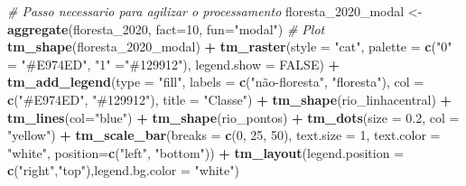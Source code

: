 \documentclass[
]{article}
\newenvironment{Shaded}{\begin{snugshade}}{\end{snugshade}}
\newcommand{\AttributeTok}[1]{\textcolor[rgb]{0.13,0.29,0.53}{#1}}
\newcommand{\CommentTok}[1]{\textcolor[rgb]{0.56,0.35,0.01}{\textit{#1}}}
\newcommand{\ConstantTok}[1]{\textcolor[rgb]{0.56,0.35,0.01}{#1}}
\newcommand{\DecValTok}[1]{\textcolor[rgb]{0.00,0.00,0.81}{#1}}
\newcommand{\FloatTok}[1]{\textcolor[rgb]{0.00,0.00,0.81}{#1}}
\newcommand{\FunctionTok}[1]{\textcolor[rgb]{0.13,0.29,0.53}{\textbf{#1}}}
\newcommand{\NormalTok}[1]{#1}
\newcommand{\OtherTok}[1]{\textcolor[rgb]{0.56,0.35,0.01}{#1}}
\newcommand{\SpecialCharTok}[1]{\textcolor[rgb]{0.81,0.36,0.00}{\textbf{#1}}}
\newcommand{\StringTok}[1]{\textcolor[rgb]{0.31,0.60,0.02}{#1}}
\begin{document}
\begin{Shaded}
\begin{Highlighting}[]
\CommentTok{\# Passo necessario para agilizar o processamento}
\NormalTok{floresta\_2020\_modal }\OtherTok{\textless{}{-}} \FunctionTok{aggregate}\NormalTok{(floresta\_2020, }
                                 \AttributeTok{fact=}\DecValTok{10}\NormalTok{, }
                                 \AttributeTok{fun=}\StringTok{"modal"}\NormalTok{)}
\CommentTok{\# Plot}
\FunctionTok{tm\_shape}\NormalTok{(floresta\_2020\_modal) }\SpecialCharTok{+}
  \FunctionTok{tm\_raster}\NormalTok{(}\AttributeTok{style =} \StringTok{"cat"}\NormalTok{, }
            \AttributeTok{palette =} \FunctionTok{c}\NormalTok{(}\StringTok{"0"} \OtherTok{=} \StringTok{"\#E974ED"}\NormalTok{, }\StringTok{"1"} \OtherTok{=}\StringTok{"\#129912"}\NormalTok{), }\AttributeTok{legend.show =} \ConstantTok{FALSE}\NormalTok{) }\SpecialCharTok{+} 
  \FunctionTok{tm\_add\_legend}\NormalTok{(}\AttributeTok{type =} \StringTok{"fill"}\NormalTok{, }\AttributeTok{labels =} \FunctionTok{c}\NormalTok{(}\StringTok{"não{-}floresta"}\NormalTok{, }\StringTok{"floresta"}\NormalTok{),}
    \AttributeTok{col =} \FunctionTok{c}\NormalTok{(}\StringTok{"\#E974ED"}\NormalTok{, }\StringTok{"\#129912"}\NormalTok{), }\AttributeTok{title =} \StringTok{"Classe"}\NormalTok{) }\SpecialCharTok{+}
\FunctionTok{tm\_shape}\NormalTok{(rio\_linhacentral) }\SpecialCharTok{+} 
  \FunctionTok{tm\_lines}\NormalTok{(}\AttributeTok{col=}\StringTok{"blue"}\NormalTok{) }\SpecialCharTok{+} 
\FunctionTok{tm\_shape}\NormalTok{(rio\_pontos) }\SpecialCharTok{+} 
  \FunctionTok{tm\_dots}\NormalTok{(}\AttributeTok{size =} \FloatTok{0.2}\NormalTok{, }\AttributeTok{col =} \StringTok{"yellow"}\NormalTok{) }\SpecialCharTok{+} 
\FunctionTok{tm\_scale\_bar}\NormalTok{(}\AttributeTok{breaks =} \FunctionTok{c}\NormalTok{(}\DecValTok{0}\NormalTok{, }\DecValTok{25}\NormalTok{, }\DecValTok{50}\NormalTok{), }\AttributeTok{text.size =} \DecValTok{1}\NormalTok{, }
             \AttributeTok{text.color =} \StringTok{"white"}\NormalTok{, }\AttributeTok{position=}\FunctionTok{c}\NormalTok{(}\StringTok{"left"}\NormalTok{, }\StringTok{"bottom"}\NormalTok{)) }\SpecialCharTok{+}
\FunctionTok{tm\_layout}\NormalTok{(}\AttributeTok{legend.position =} \FunctionTok{c}\NormalTok{(}\StringTok{"right"}\NormalTok{,}\StringTok{"top"}\NormalTok{),}\AttributeTok{legend.bg.color =} \StringTok{"white"}\NormalTok{)}
\end{Highlighting}
\end{Shaded}
\end{document}
